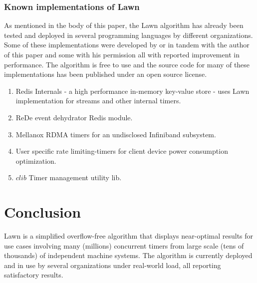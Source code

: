 \documentclass[conference]{IEEEtran}
\begin{document}
\subsubsection{Known implementations of Lawn}
As mentioned in the body of this paper, the Lawn algorithm has already been tested and deployed in several programming languages by different organizations. Some of these implementations were developed by or in tandem with the author of this paper and some with his permission all with reported improvement in performance. The algorithm is free to use and the source code for many of these implementations has been published under an open source license.
\begin{enumerate}
	\item Redis Internals \cite{Redis} - a high performance in-memory key-value store - uses Lawn implementation for streams and other internal timers.
	\item ReDe event dehydrator Redis module\cite{REDE}.
	\item Mellanox RDMA timers for an undisclosed Infiniband subsystem.
	\item User specific rate limiting-timers for client device power consumption optimization\cite{VUSR}.
	\item $clib$ Timer management utility lib.
\end{enumerate}



\section{Conclusion}
Lawn is a simplified overflow-free algorithm that displays near-optimal results for use cases involving many (millions) concurrent timers from large scale (tens of thousands) of independent machine systems. 
The algorithm is currently deployed and in use by several organizations under real-world load, all reporting satisfactory results.




\end{document}
